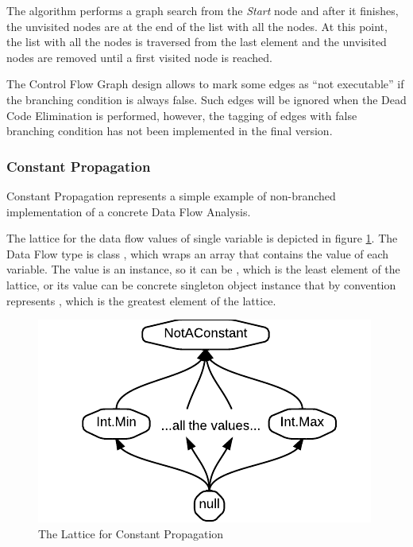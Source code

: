         The algorithm performs a graph search from the \emph{Start} 
        node and after it finishes, the unvisited nodes are 
        at the end of the list with all the nodes. At this point, 
        the list with all the nodes is traversed from the last 
        element and the unvisited nodes are removed until a 
        first visited node is reached.
        
        The Control Flow Graph design allows to mark 
        some edges as ``not executable'' if the branching 
        condition is always false. Such edges will be ignored 
        when the Dead Code Elimination is performed, however, 
        the tagging of edges with false branching condition 
        has not been implemented in the final version.
        
        \subsubsection*{Constant Propagation}
        Constant Propagation represents a simple example of non-branched 
        implementation of a concrete Data Flow Analysis. 
        
        The lattice for the data flow values of single variable is 
        depicted in figure \ref{constlattice}. The Data Flow type is class 
        , which wraps an array 
        that contains the value of each variable. 
        The value is an  instance, so it can be , which 
        is the least element of the lattice, or its value can be concrete 
        singleton object instance that by convention represents 
        , which is the greatest element of the lattice.
        
\begin{figure}[h]  
  \centering
    \includegraphics{img/ConstLattice.pdf}  
    \caption{The Lattice for Constant Propagation\label{constlattice}}
\end{figure}        
        
